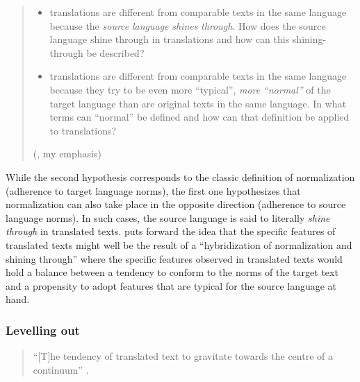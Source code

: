 \begin{quote}
\begin{itemize} 
	\item translations are different from comparable texts in the same language because the \textit{source} \textit{language} \textit{shines} \textit{through}. How does the source language shine through in translations and how can this shining-through be described?
	\item translations are different from comparable texts in the same language because they try to be even more ``typical'', \textit{more} \textit{``normal''} of the target language than are original texts in the same language. In what terms can ``normal'' be defined and how can that definition be applied to translations?
\end{itemize}
\hfill(\citealt[61--62]{teich_cross-linguistic_2003}, my emphasis)
\end{quote}

While the second hypothesis corresponds to the classic definition of normalization (adherence to target language norms), the first one hypothesizes that normalization can also take place in the opposite direction (adherence to source language norms). In such cases, the source language is said to literally \textit{shine} \textit{through} in translated texts. \citet[136]{kranich_between_2011} puts forward the idea that the specific features of translated texts might well be the result of a “hybridization of normalization and shining through” where the specific features observed in translated texts would hold a balance between a tendency to conform to the norms of the target text and a propensity to adopt features that are typical for the source language at hand.

\subsubsection{Levelling out}
\label{sec:2.2.2.4}  
\begin{quote}
“[T]he tendency of translated text to gravitate towards the centre of a continuum” \citep[184]{baker_corpus-based_1996}.
\end{quote}

